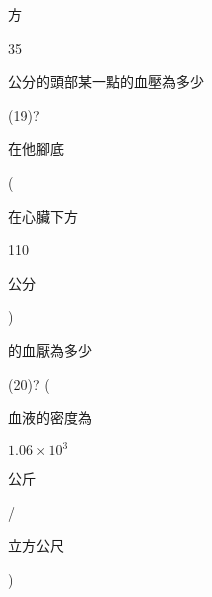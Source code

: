 \documentclass[10pt]{article}
\begin{document}
\begin{CJK}{UTF8}{mj}方\end{CJK} 35 \begin{CJK}{UTF8}{mj}公分的頭部某一點的血壓為多少\end{CJK}(19)?\begin{CJK}{UTF8}{mj}在他腳底\end{CJK}(\begin{CJK}{UTF8}{mj}在心臟下方\end{CJK} 110 \begin{CJK}{UTF8}{mj}公分\end{CJK}) \begin{CJK}{UTF8}{mj}的血厭為多少\end{CJK} (20)? (\begin{CJK}{UTF8}{mj}血液的密度為\end{CJK} $1.06 \times 10^{3}$ \begin{CJK}{UTF8}{mj}公斤\end{CJK}/\begin{CJK}{UTF8}{mj}立方公尺\end{CJK})
\end{document}
